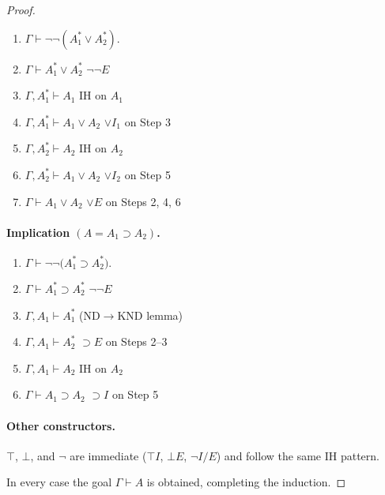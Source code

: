 \documentclass{article}
\begin{document}
\begin{proof}[Proof]
\begin{enumerate}[leftmargin=1.5em,labelsep=.5em,
                  label=\textbf{Step~\arabic*:}]
  \item $\Gamma \vdash \neg\neg(A_{1}^{*}\lor A_{2}^{*}).$
  \item $\Gamma \vdash A_{1}^{*}\lor A_{2}^{*}$ \hfill $\neg\neg E$
  \item $\Gamma, A_{1}^{*} \vdash A_{1}$ \hfill IH on $A_{1}$
  \item $\Gamma, A_{1}^{*} \vdash A_{1}\lor A_{2}$ \hfill $\lor I_{1}$ on Step 3
  \item $\Gamma, A_{2}^{*} \vdash A_{2}$ \hfill IH on $A_{2}$
  \item $\Gamma, A_{2}^{*} \vdash A_{1}\lor A_{2}$ \hfill $\lor I_{2}$ on Step 5
  \item $\Gamma \vdash A_{1}\lor A_{2}$ \hfill $\lor E$ on Steps 2, 4, 6
\end{enumerate}


  
  \paragraph{Implication \boldmath$(A = A_{1}\supset A_{2})$.}

\begin{enumerate}[leftmargin=1.5em,labelsep=.5em,
                  label=\textbf{Step~\arabic*:}]
  \item $\Gamma \vdash \neg\neg\bigl(A_{1}^{*}\supset A_{2}^{*}\bigr).$
  \item $\Gamma \vdash A_{1}^{*}\supset A_{2}^{*}$ \hfill $\neg\neg E$
  \item $\Gamma , A_{1} \vdash A_{1}^{*}$ \hfill (ND$\!\to$KND lemma)
  \item $\Gamma , A_{1} \vdash A_{2}^{*}$ \hfill $\supset E$ on Steps 2–3
  \item $\Gamma , A_{1} \vdash A_{2}$ \hfill IH on $A_{2}$
  \item $\Gamma \vdash A_{1}\supset A_{2}$ \hfill $\supset I$ on Step 5
\end{enumerate}

  
  \paragraph{Other constructors.}
  $\top$, $\bot$, and $\neg$ are immediate
  (\(\top\!I\), \(\bot\!E\), \(\neg I/E\)) and follow the same IH pattern.
  
  \bigskip
  In every case the goal $\Gamma\vdash A$ is obtained, completing the induction.
  \end{proof}
\end{document}
